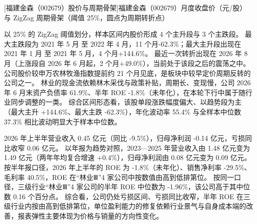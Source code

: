 \begin{center}
\begin{minipage}{\textwidth}\centering
{}

[福建金森（002679）股价与周期骨架]{福建金森（002679）月度收盘价（元/股）与 ZigZag 周期骨架（阈值 25\%，圆点为周期转折点）}
\end{minipage}
\end{center}

 以 25\% 的 ZigZag 阈值划分，样本区间内股价形成 4 个主升段与 3 个主跌段。 最大主跌段为 2021 年 5 月 至 2022 年 4 月，11 个月-62.3\%；最大主升段出现在 2021 年 1 月 至 2021 年 5 月，4 个月+144.6\%。 最近一次转折出现在 2026 年 8 月（上涨段自 2026 年 6 月起，2 个月+49.0\%），当前处于该段之后的震荡之中。 公司股价较申万农林牧渔指数提前约 21 个月见底，是板块中较早定价周期反转的公司之一。 林业的现金流依赖林木采伐与政策补贴，周期长、变现慢，公司 2026 年 6 月末资产负债率 61.9\%、半年 ROE -1.8\%（未年化），在本轮下行中属于随行业同步调整的一类。 综合区间形态看，该股单段涨跌幅度偏大、以趋势段为主（最大主升 +144.6\%、最大主跌 -62.3\%），年化波动率 55.4\% 与全样本中位数 37.3\% 相比波动明显大于样本中位数。

 2026 年上半年营业收入 0.45 亿元（同比 -9.5\%），归母净利润 -0.14 亿元，亏损同比收窄 0.06 亿元。 以年报为趋势对照，2023---2025 年营业收入由 1.48 亿元变为 1.49 亿元（两年年均复合增速 +0.4\%），归母净利润由 0.08 亿元变为 0.09 亿元。 按半年报口径，2026 年上半年的 ROE 为 -1.8\%（未年化）、销售净利率 -29.5\%、毛利率 40.5\%，ROE 在“林业Ⅲ”4 家公司中按数值由高到低排第位。 按同一口径，三级行业“林业Ⅲ”4 家公司的半年 ROE 中位数为 -1.96\%，该公司高于其中位数 0.16 个百分点。 综合看，公司仍处亏损区间、亏损同比收窄，半年 ROE 在三级行业内按由高到低排第位，单位盈利能力的修复依赖行业景气与自身成本端的改善，报表弹性主要体现为价格与销量的方向性变化。

